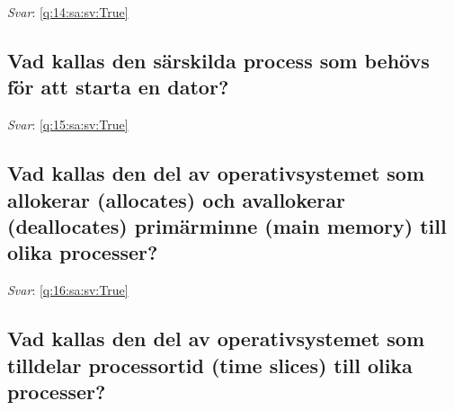 \documentclass[a4paper,11pt,oneside]{article}
\begin{document}
\begin{sloppypar}
\label{q:14:sa:sv:False}

\vspace{2cm}

\noindent\makebox[\textwidth]{\hrulefill}

\vspace{1cm}

\textit{Svar}: \autoref{q:14:sa:sv:True}



\subsection{Vad kallas den s\"arskilda process som beh\"ovs f\"or att starta en dator?}

\label{q:15:sa:sv:False}

\vspace{2cm}

\noindent\makebox[\textwidth]{\hrulefill}

\vspace{1cm}

\textit{Svar}: \autoref{q:15:sa:sv:True}



\subsection{Vad kallas den del av operativsystemet som allokerar (allocates) och avallokerar (deallocates) prim\"arminne (main memory) till olika processer?}

\label{q:16:sa:sv:False}

\vspace{2cm}

\noindent\makebox[\textwidth]{\hrulefill}

\vspace{1cm}

\textit{Svar}: \autoref{q:16:sa:sv:True}



\subsection{Vad kallas den del av operativsystemet som tilldelar processortid (time slices) till olika processer?}

\label{q:17:sa:sv:False}

\vspace{2cm}

\noindent\makebox[\textwidth]{\hrulefill}

\vspace{1cm}


\end{sloppypar}
\end{document}
